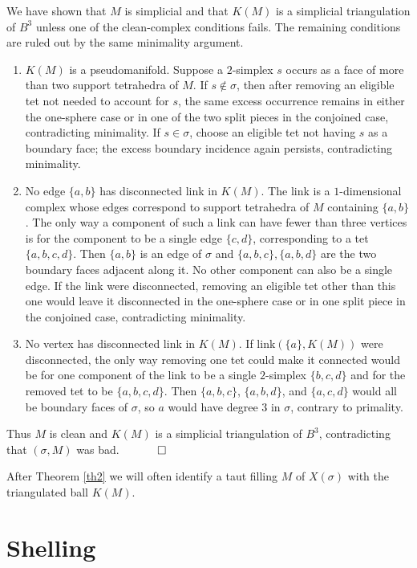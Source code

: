 \documentclass[12pt]{article}
\newcommand{\proofend}{$\quad \qed$}
\newcommand{\kw}{\mathrm}
\newcommand{\link}{\kw{link}}
\begin{document}
We have shown that $M$ is simplicial and that $K(M)$ is a simplicial
triangulation of $B^3$ unless one of the clean-complex conditions fails.
The remaining conditions are ruled out by the same minimality argument.

\begin{enumerate}
\item
$K(M)$ is a pseudomanifold.
Suppose a $2$-simplex $s$ occurs as a face of more than two support
tetrahedra of $M$.
If $s \notin \sigma$, then after removing an eligible tet not needed to
account for $s$, the same excess occurrence remains in either the
one-sphere case or in one of the two split pieces in the conjoined case,
contradicting minimality.
If $s \in \sigma$, choose an eligible tet not having $s$ as a boundary
face; the excess boundary incidence again persists, contradicting
minimality.

\item
No edge $\{a,b\}$ has disconnected link in $K(M)$.
The link is a $1$-dimensional complex whose edges correspond to support
tetrahedra of $M$ containing $\{a,b\}$.
The only way a component of such a link can have fewer than three
vertices is for the component to be a single edge $\{c,d\}$,
corresponding to a tet $\{a,b,c,d\}$.
Then $\{a,b\}$ is an edge of $\sigma$ and
$\{a,b,c\},\{a,b,d\}$ are the two boundary faces adjacent along it.
No other component can also be a single edge.
If the link were disconnected, removing an eligible tet other than this
one would leave it disconnected in the one-sphere case or in one split
piece in the conjoined case, contradicting minimality.

\item
No vertex has disconnected link in $K(M)$.
If $\link(\{a\},K(M))$ were disconnected, the only way removing one tet
could make it connected would be for one component of the link to be a
single $2$-simplex $\{b,c,d\}$ and for the removed tet to be
$\{a,b,c,d\}$.
Then $\{a,b,c\}$, $\{a,b,d\}$, and $\{a,c,d\}$ would all be boundary
faces of $\sigma$, so $a$ would have degree $3$ in $\sigma$, contrary to
primality.
\end{enumerate}

Thus $M$ is clean and $K(M)$ is a simplicial triangulation of $B^3$,
contradicting that $(\sigma,M)$ was bad.
\proofend

After Theorem \ref{th2} we will often identify a taut filling $M$ of
$X(\sigma)$ with the triangulated ball $K(M)$.

\section{Shelling}
\end{document}
